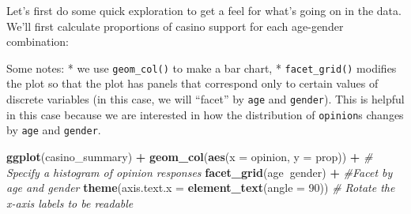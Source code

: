 \documentclass[
]{book}
\newenvironment{Shaded}{\begin{snugshade}}{\end{snugshade}}
\newcommand{\CommentTok}[1]{\textcolor[rgb]{0.56,0.35,0.01}{\textit{#1}}}
\newcommand{\DataTypeTok}[1]{\textcolor[rgb]{0.13,0.29,0.53}{#1}}
\newcommand{\DecValTok}[1]{\textcolor[rgb]{0.00,0.00,0.81}{#1}}
\newcommand{\KeywordTok}[1]{\textcolor[rgb]{0.13,0.29,0.53}{\textbf{#1}}}
\newcommand{\NormalTok}[1]{#1}
\newcommand{\OperatorTok}[1]{\textcolor[rgb]{0.81,0.36,0.00}{\textbf{#1}}}
\newcommand{\StringTok}[1]{\textcolor[rgb]{0.31,0.60,0.02}{#1}}
\begin{document}
Let's first do some quick exploration to get a feel for what's going on in the data. We'll first calculate proportions of casino support for each age-gender combination:

\begin{Shaded}
\end{Shaded}

Some notes:
* we use \texttt{geom\_col()} to make a bar chart,
* \texttt{facet\_grid()} modifies the plot so that the plot has panels that correspond only to certain values of discrete variables (in this case, we will ``facet'' by \texttt{age} and \texttt{gender}). This is helpful in this case because we are interested in how the distribution of \texttt{opinion}s changes by \texttt{age} and \texttt{gender}.

\begin{Shaded}
\begin{Highlighting}[]
\KeywordTok{ggplot}\NormalTok{(casino_summary) }\OperatorTok{+}
\StringTok{  }\KeywordTok{geom_col}\NormalTok{(}\KeywordTok{aes}\NormalTok{(}\DataTypeTok{x =}\NormalTok{ opinion, }\DataTypeTok{y =}\NormalTok{ prop)) }\OperatorTok{+}\StringTok{ }\CommentTok{# Specify a histogram of opinion responses}
\StringTok{  }\KeywordTok{facet_grid}\NormalTok{(age}\OperatorTok{~}\NormalTok{gender) }\OperatorTok{+}\StringTok{ }\CommentTok{#Facet by age and gender}
\StringTok{  }\KeywordTok{theme}\NormalTok{(}\DataTypeTok{axis.text.x =} \KeywordTok{element_text}\NormalTok{(}\DataTypeTok{angle =} \DecValTok{90}\NormalTok{)) }\CommentTok{# Rotate the x-axis labels to be readable}
\end{Highlighting}
\end{Shaded}
\end{document}
